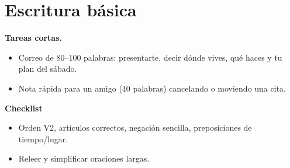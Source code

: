 \section{Escritura básica}
\textbf{Tareas cortas.}
\begin{itemize}[leftmargin=*]
  \item Correo de 80--100 palabras: presentarte, decir dónde vives, qué haces y tu plan del sábado.
  \item Nota rápida para un amigo (40 palabras) cancelando o moviendo una cita.
\end{itemize}

\textbf{Checklist}
\begin{itemize}[leftmargin=*]
  \item Orden V2, artículos correctos, negación sencilla, preposiciones de tiempo/lugar.
  \item Releer y simplificar oraciones largas.
\end{itemize}
